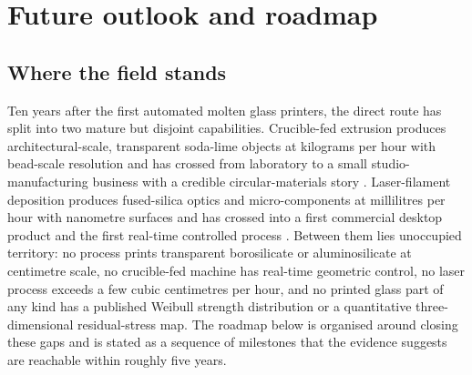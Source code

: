 \section{Future outlook and roadmap}
\label{sec:outlook}

\subsection{Where the field stands}
Ten years after the first automated molten glass printers, the direct route has split into two mature but disjoint capabilities. Crucible-fed extrusion produces architectural-scale, transparent soda-lime objects at kilograms per hour with bead-scale resolution and has crossed from laboratory to a small studio-manufacturing business with a credible circular-materials story \citep{inamura2018,mit2024masonry,stern2024cgc}. Laser-filament deposition produces fused-silica optics and micro-components at millilitres per hour with nanometre surfaces and has crossed into a first commercial desktop product and the first real-time controlled process \citep{lgd2024homog,kth2024microlens,nobula_aniwaa,dgf2026control}. Between them lies unoccupied territory: no process prints transparent borosilicate or aluminosilicate at centimetre scale, no crucible-fed machine has real-time geometric control, no laser process exceeds a few cubic centimetres per hour, and no printed glass part of any kind has a published Weibull strength distribution or a quantitative three-dimensional residual-stress map. The roadmap below is organised around closing these gaps and is stated as a sequence of milestones that the evidence suggests are reachable within roughly five years.

